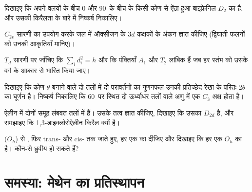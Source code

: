 \begin{exercise}[$\star\star$]\label{exo:b3:point-groups:7}
दिखाइए कि अपने वलयों के बीच 0 और 90\textdegree\ के बीच के किसी कोण से ऐंठा हुआ
बाइफ़ेनिल $D_2$ का है, और उसकी किरैलता के बारे में निष्कर्ष निकालिए।
\end{exercise}

\begin{exercise}[$\star\star$]\label{exo:b3:point-groups:8}
$C_{2v}$ सारणी का उपयोग करके जल में ऑक्सीजन के $3d$ कक्षकों के अंकन ज्ञात कीजिए
(द्विघाती फलनों को उनकी आकृतियाँ मानिए)।
\end{exercise}

\begin{exercise}[$\star\star$]\label{exo:b3:point-groups:9}
$T_d$ सारणी पर जाँचिए कि $\sum_id_i^2 = h$ और कि पंक्तियाँ $A_1$ और $T_2$
लांबिक हैं जब हर स्तंभ को उसके वर्ग के आकार से भारित किया जाए।
\end{exercise}

\begin{exercise}[$\star\star\star$]\label{exo:b3:point-groups:10}
दिखाइए कि कोण
$\theta$ बनाने वाले दो तलों में दो परावर्तनों का गुणनफल उनकी प्रतिच्छेद रेखा के परितः $2\theta$ का घूर्णन है।
निष्कर्ष निकालिए कि 60\textdegree\ पर स्थित दो ऊर्ध्वाधर तलों वाले अणु में एक $C_3$ अक्ष होता है।
\end{exercise}

\begin{exercise}[$\star\star\star$]\label{exo:b3:point-groups:11}
ऐलीन  में दोनों  समूह लंबवत तलों में हैं।
उसके तत्व ज्ञात कीजिए, दिखाइए कि उसका  $D_{2d}$ है, और समझाइए कि
1,3-डाइक्लोरोऐलीन  किरैल क्यों है।
\end{exercise}

\begin{exercise}[$\star\star\star$]\label{exo:b3:point-groups:12}
 ($O_h$) से , फिर trans- और
cis- तक जाते हुए, हर एक का  दीजिए और दिखाइए कि हर एक
$O_h$ का  है। कौन-से ध्रुवीय हो सकते हैं?
\end{exercise}

\section{समस्या: मेथेन का प्रतिस्थापन}

